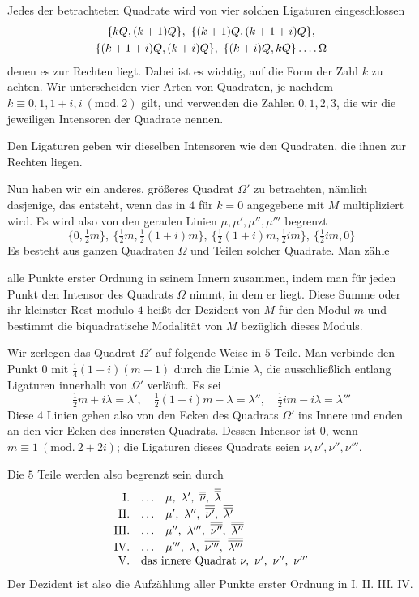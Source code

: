Jedes der betrachteten Quadrate wird von vier solchen Ligaturen eingeschlossen
\[
\begin{gathered}
\{kQ,(k+1)Q\},\ \{(k+1)Q,(k+1+i)Q\},\\
\{(k+1+i)Q,(k+i)Q\},\ \{(k+i)Q,kQ\}\mathinner{.\,.\,.\,.}\Omega
\end{gathered}
\]
denen es zur Rechten liegt. Dabei ist es wichtig, auf die Form der Zahl $k$ zu achten. Wir unterscheiden vier Arten von Quadraten, je nachdem $k\equiv0,1,1+i,i\ (\mathrm{mod.}\ 2)$ gilt, und verwenden die Zahlen $0,1,2,3$, die wir die jeweiligen Intensoren der Quadrate nennen.

Den Ligaturen geben wir dieselben Intensoren wie den Quadraten, die ihnen zur Rechten liegen.

Nun haben wir ein anderes, größeres Quadrat $\Omega'$ zu betrachten, nämlich dasjenige, das entsteht, wenn das in $4$ für $k=0$ angegebene mit $M$ multipliziert wird. Es wird also von den geraden Linien $\mu,\mu',\mu'',\mu'''$ begrenzt
\[
\{0,\tfrac12m\},\ \{\tfrac12m,\tfrac12(1+i)m\},\ \{\tfrac12(1+i)m,\tfrac12im\},\ \{\tfrac12im,0\}
\]
Es besteht aus ganzen Quadraten $\Omega$ und Teilen solcher Quadrate. Man zähle

alle Punkte erster Ordnung in seinem Innern zusammen, indem man für jeden Punkt den Intensor des Quadrats $\Omega$ nimmt, in dem er liegt. Diese Summe oder ihr kleinster Rest modulo $4$ heißt der Dezident von $M$ für den Modul $m$ und bestimmt die biquadratische Modalität von $M$ bezüglich dieses Moduls.

Wir zerlegen das Quadrat $\Omega'$ auf folgende Weise in $5$ Teile. Man verbinde den Punkt $0$ mit $\frac14(1+i)(m-1)$ durch die Linie $\lambda$, die ausschließlich entlang Ligaturen innerhalb von $\Omega'$ verläuft. Es sei
\[
\tfrac12m+i\lambda=\lambda',\quad\tfrac12(1+i)m-\lambda=\lambda'',\quad\tfrac12im-i\lambda=\lambda'''
\]
Diese $4$ Linien gehen also von den Ecken des Quadrats $\Omega'$ ins Innere und enden an den vier Ecken des innersten Quadrats. Dessen Intensor ist $0$, wenn $m\equiv1\ (\mathrm{mod.}\ 2+2i)$; die Ligaturen dieses Quadrats seien $\nu,\nu',\nu'',\nu'''$.

Die $5$ Teile werden also begrenzt sein durch
\[
\begin{array}{rll}
\mathrm{I}.&\ldots&\mu,\ \lambda',\ \overline{\overline\nu},\ \overline{\overline\lambda}\\
\mathrm{II}.&\ldots&\mu',\ \lambda'',\ \overline{\overline{\nu'}},\ \overline{\overline{\lambda'}}\\
\mathrm{III}.&\ldots&\mu'',\ \lambda''',\ \overline{\overline{\nu''}},\ \overline{\overline{\lambda''}}\\
\mathrm{IV}.&\ldots&\mu''',\ \lambda,\ \overline{\overline{\nu'''}},\ \overline{\overline{\lambda'''}}\\
\mathrm{V}.&\multicolumn{2}{l}{\text{das innere Quadrat }\nu,\ \nu',\ \nu'',\ \nu'''}
\end{array}
\]
Der Dezident ist also die Aufzählung aller Punkte erster Ordnung in I. II. III. IV.

